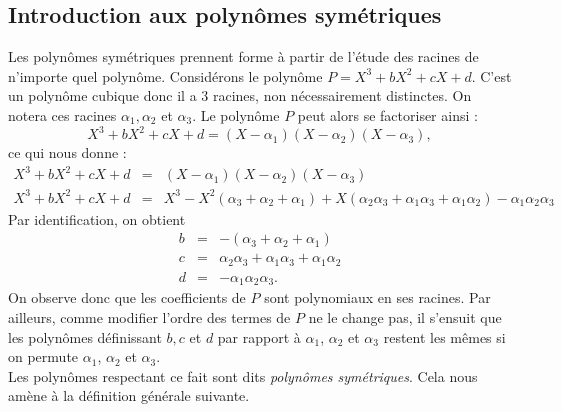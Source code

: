 \documentclass[12pt]{article}
\theoremstyle{remark}\newtheorem{note}{Note}
\theoremstyle{remark}\newtheorem{nota}{Notation}
\theoremstyle{definition}
\begin{document}
\subsection{Introduction aux polynômes symétriques}
Les polynômes symétriques prennent forme à partir de l'étude des racines de n'importe quel polynôme. Considérons le polynôme $P=X^3 + bX^2 + cX + d$. C'est un polynôme cubique donc il a $3$ racines, non nécessairement distinctes. On notera ces racines $\alpha_1 , \alpha_2$ et $\alpha_3$.
Le polynôme $P$ peut alors se factoriser ainsi :
$$X^3 + bX^2 + cX + d = (X - \alpha_1)(X - \alpha_2)(X - \alpha_3),$$
ce qui nous donne :
\begin{eqnarray}
X^3 + bX^2 + cX + d &=& (X - \alpha_1)(X - \alpha_2)(X - \alpha_3) \nonumber \\
X^3 + bX^2 + cX + d &=& X^3 - X^2(\alpha_3 + \alpha_2 + \alpha_1) + X(\alpha_2 \alpha_3 + \alpha_1 \alpha_3 + \alpha_1 \alpha_2) - \alpha_1 \alpha_2 \alpha_3 \nonumber
\end{eqnarray}
Par identification, on obtient 
\begin{eqnarray}
b &=& -(\alpha_3 + \alpha_2 + \alpha_1) \nonumber \\
c &=& \alpha_2 \alpha_3 + \alpha_1 \alpha_3 + \alpha_1 \alpha_2 \nonumber \\
d &=& - \alpha_1 \alpha_2 \alpha_3. \nonumber 
\end{eqnarray}
On observe donc que les coefficients de $P$ sont polynomiaux en ses racines. Par ailleurs, comme modifier l'ordre des termes de $P$ ne le change pas, il s'ensuit que les polynômes définissant $b,c$ et $d$ par rapport à $\alpha_1$, $\alpha_2$ et $\alpha_3$ restent les mêmes si on permute $\alpha_1$, $\alpha_2$ et $\alpha_3$.\\
Les polynômes respectant ce fait sont dits \textit{polynômes symétriques}. Cela nous amène à la définition générale suivante.\\

\end{document}
